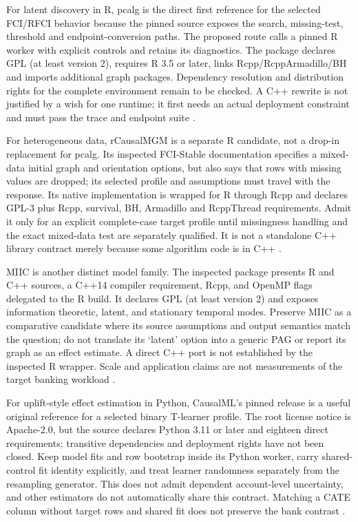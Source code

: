 For latent discovery in R, pcalg is the direct first reference for the selected
FCI/RFCI behavior because the pinned source exposes the search, missing-test,
threshold and endpoint-conversion paths. The proposed route calls a pinned R
worker with explicit controls and retains its diagnostics. The package declares
GPL (at least version 2), requires R 3.5 or later, links Rcpp/RcppArmadillo/BH
and imports additional graph packages. Dependency resolution and distribution
rights for the complete environment remain to be checked. A C++ rewrite is not
justified by a wish for one runtime; it first needs an actual deployment
constraint and must pass the trace and endpoint suite
\citep{exec13_pcalg_reuse_primary,exec13_latentr_primary}.

For heterogeneous data, rCausalMGM is a separate R candidate, not a drop-in
replacement for pcalg. Its inspected FCI-Stable documentation specifies a
mixed-data initial graph and orientation options, but also says that rows with
missing values are dropped; its selected profile and assumptions must travel
with the response. Its native implementation is wrapped for R through Rcpp
and declares GPL-3 plus Rcpp, survival, BH, Armadillo and RcppThread
requirements. Admit it only for an explicit complete-case target profile
until missingness handling and the exact mixed-data test are separately
qualified. It is not a standalone C++ library contract merely because some
algorithm code is in C++ \citep{exec14_native_rcmgm}.

MIIC is another distinct model family. The inspected package presents R and
C++ sources, a C++14 compiler requirement, Rcpp, and OpenMP flags delegated to
the R build. It declares GPL (at least version 2) and exposes information
theoretic, latent, and stationary temporal modes. Preserve MIIC as a comparative
candidate where its source assumptions and output semantics match the
question; do not translate its `latent' option into a generic PAG or report
its graph as an effect estimate. A direct C++ port is not established by the
inspected R wrapper. Scale and application claims are not measurements of the
target banking workload \citep{exec14_native_miic}.

For uplift-style effect estimation in Python, CausalML's pinned release is a
useful original reference for a selected binary T-learner profile. The root
license notice is Apache-2.0, but the source declares Python 3.11 or later and
eighteen direct requirements; transitive dependencies and deployment rights
have not been closed. Keep model fits and row bootstrap inside its Python
worker, carry shared-control fit identity explicitly, and treat learner
randomness separately from the resampling generator. This does not admit
dependent account-level uncertainty, and other estimators do not automatically
share this contract. Matching a CATE column without target rows and shared fit
does not preserve the bank contrast \citep{exec14_causalml_primary}.

